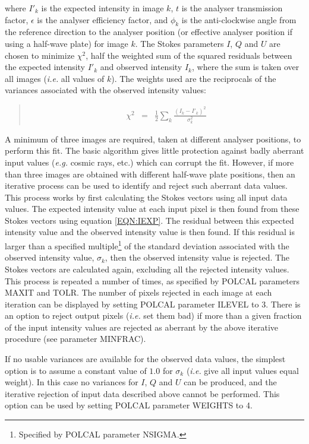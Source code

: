 \documentclass[twoside,11pt]{article}
\renewcommand{\_}{\texttt{\symbol{95}}}
\newenvironment{myquote}{\begin{quote}\begin{small}}{\end{small}\end{quote}}
\begin{document}
where $I'_{k}$ is the expected intensity in image $k$, $t$ is the analyser
transmission factor, $\epsilon$ is the analyser efficiency factor, and
$\phi_{k}$ is the anti-clockwise angle from the reference direction to the
analyser position (or effective analyser position if using a half-wave
plate) for image $k$. The Stokes parameters $I$, $Q$ and $U$ are chosen
to minimize $\chi^2$, half the weighted sum of the squared residuals between 
the expected intensity $I'_{k}$ and observed intensity $I_{k}$, where the sum is taken over all images
(\emph{i.e.} all values of $k$). The weights used are the reciprocals of
the variances associated with the observed intensity values:

\begin{myquote}
\begin{eqnarray*}
  \label{EQN:CHI}
  \chi^2 & = & \frac{1}{2}\sum_{k} \frac{(I_{k}-I'_{k})^2}{\sigma^2_{k}}
\end{eqnarray*}
\end{myquote}

A minimum of three images are required, taken at different analyser
positions, to perform this fit. The basic algorithm gives little
protection against badly aberrant input values (\emph{e.g.} cosmic rays,
etc.) which can corrupt the fit. However, if more than three images are
obtained with different half-wave plate positions, then an iterative
process can be used to identify and reject such aberrant data values.
This process works by first calculating the Stokes vectors using all
input data values. The expected intensity value at each input pixel is
then found from these Stokes vectors using equation \ref{EQN:IEXP}. The
residual between this expected intensity value and the observed intensity
value is then found. If this residual is larger than a specified
multiple\footnote{Specified by POLCAL parameter NSIGMA.} of the standard
deviation associated with the observed intensity value, $\sigma_k$, then
the observed intensity value is rejected. The Stokes vectors are
calculated again, excluding all the rejected intensity values. This
process is repeated a number of times, as specified by POLCAL parameters
MAXIT and TOLR. The number of pixels rejected in each image at each iteration can
be displayed by setting POLCAL parameter ILEVEL to 3. There is an option
to reject output pixels (\emph{i.e.} set them bad) if more than a given
fraction of the input intensity values are rejected as aberrant by the
above iterative procedure (see parameter MINFRAC).

If no usable variances are available for the observed data values, the
simplest option is to assume a constant value of $1.0$ for $\sigma_{k}$ 
(\emph{i.e.} give all input values equal weight). In this case no
variances for $I$, $Q$ and $U$ can be produced, and the iterative rejection
of input data described above cannot be performed. This option can be
used by setting POLCAL parameter WEIGHTS to 4.
\end{document}
